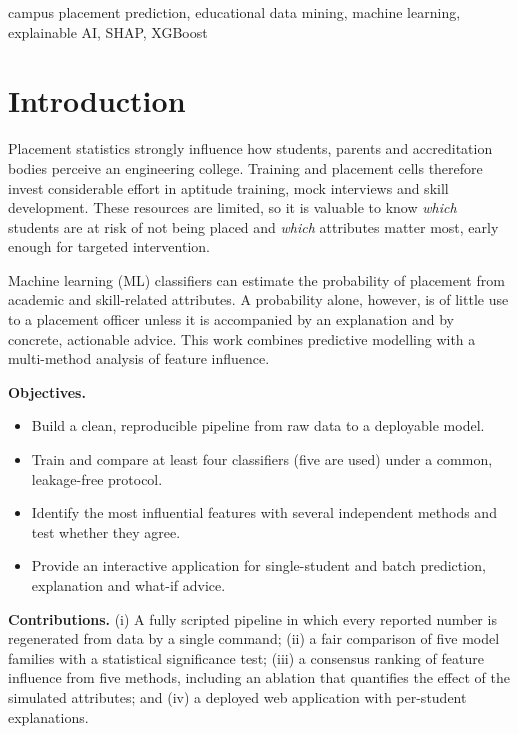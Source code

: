\documentclass[conference]{IEEEtran}
\begin{document}
\begin{IEEEkeywords}
campus placement prediction, educational data mining, machine learning, explainable AI, SHAP, XGBoost
\end{IEEEkeywords}

\section{Introduction}
Placement statistics strongly influence how students, parents and accreditation bodies perceive an engineering
college. Training and placement cells therefore invest considerable effort in aptitude training, mock interviews
and skill development. These resources are limited, so it is valuable to know \emph{which} students are at
risk of not being placed and \emph{which} attributes matter most, early enough for targeted intervention.

Machine learning (ML) classifiers can estimate the probability of placement from academic and skill-related
attributes. A probability alone, however, is of little use to a placement officer unless it is accompanied by
an explanation and by concrete, actionable advice. This work combines predictive modelling with a multi-method
analysis of feature influence.

\textbf{Objectives.}
\begin{itemize}
  \item Build a clean, reproducible pipeline from raw data to a deployable model.
  \item Train and compare at least four classifiers (five are used) under a common, leakage-free protocol.
  \item Identify the most influential features with several independent methods and test whether they agree.
  \item Provide an interactive application for single-student and batch prediction, explanation and what-if advice.
\end{itemize}

\textbf{Contributions.} (i) A fully scripted pipeline in which every reported number is regenerated from data
by a single command; (ii) a fair comparison of five model families with a statistical significance test;
(iii) a consensus ranking of feature influence from five methods, including an ablation that quantifies the
effect of the simulated attributes; and (iv) a deployed web application with per-student explanations.
\end{document}
